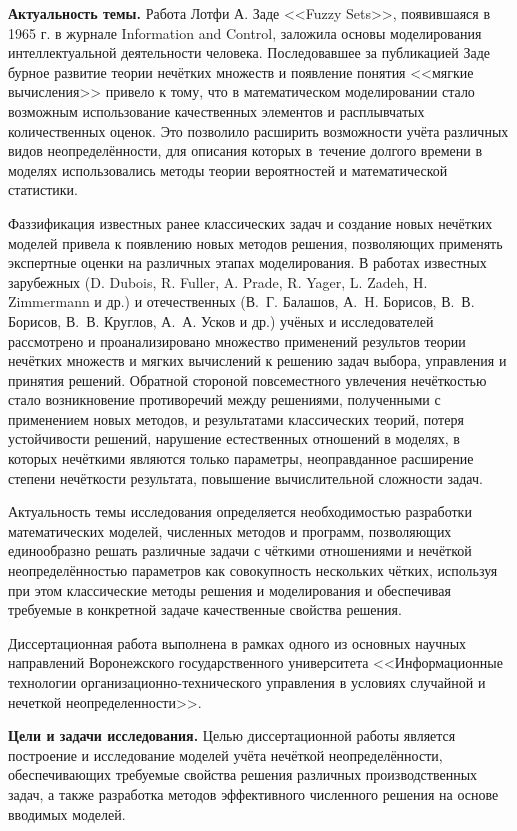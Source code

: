 \textbf{Актуальность темы.} Работа Лотфи А. Заде <<Fuzzy Sets>>, появившаяся в 1965 г. в журнале Information and Control, заложила основы моделирования интеллектуальной деятельности человека. Последовавшее за публикацией Заде бурное развитие теории нечётких множеств и появление понятия <<мягкие вычисления>> привело к тому, что в математическом моделировании стало возможным использование качественных элементов и расплывчатых количественных оценок. Это позволило расширить возможности учёта различных видов неопределённости, для описания которых в~течение долгого времени в моделях использовались методы теории вероятностей и математической статистики.

Фаззификация известных ранее классических задач и создание новых нечётких моделей привела к появлению новых методов решения, позволяющих применять экспертные оценки на различных этапах моделирования. В работах известных зарубежных (D. Dubois, R. Fuller, A. Prade, R. Yager, L. Zadeh, H. Zimmermann и др.) и отечественных (В.~Г. Балашов, А.~H. Борисов, В.~В. Борисов, В.~В. Круглов, А.~А. Усков и др.) учёных и исследователей рассмотрено и проанализировано множество применений результов теории нечётких множеств и мягких вычислений к решению задач выбора, управления и принятия решений. Обратной стороной повсеместного увлечения нечёткостью стало возникновение противоречий между решениями, полученными с применением новых методов, и результатами классических теорий, потеря устойчивости решений, нарушение естественных отношений в моделях, в которых нечёткими являются только параметры, неоправданное расширение степени нечёткости результата, повышение вычислительной сложности задач.

Актуальность темы исследования определяется необходимостью разработки математических моделей, численных методов и программ, позволяющих единообразно решать различные задачи с чёткими отношениями и нечёткой неопределённостью параметров как совокупность нескольких чётких, используя при этом классические методы решения и моделирования и обеспечивая требуемые в конкретной задаче качественные свойства решения.

Диссертационная работа выполнена в рамках одного из основных научных направлений Воронежского государственного университета <<Информационные технологии организационно-технического управления в условиях случайной и нечеткой неопределенности>>.

\textbf{Цели и задачи исследования.} Целью диссертационной работы является построение и исследование моделей учёта нечёткой неопределённости, обеспечивающих требуемые свойства решения различных производственных задач, а также разработка методов эффективного численного решения на основе вводимых моделей.

